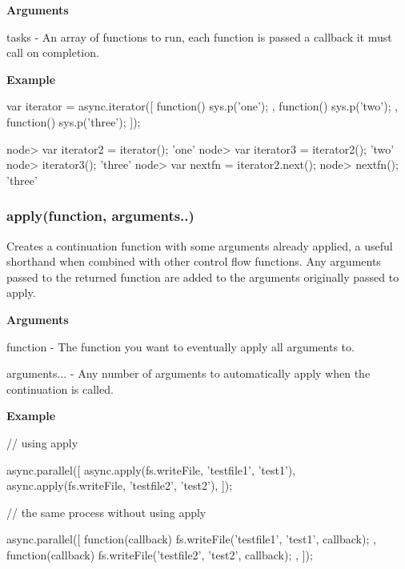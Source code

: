 {\bfseries Arguments}


\begin{DoxyItemize}
\item tasks -\/ An array of functions to run, each function is passed a callback it must call on completion.
\end{DoxyItemize}

{\bfseries Example} \begin{DoxyVerb}var iterator = async.iterator([
    function(){ sys.p('one'); },
    function(){ sys.p('two'); },
    function(){ sys.p('three'); }
]);

node> var iterator2 = iterator();
'one'
node> var iterator3 = iterator2();
'two'
node> iterator3();
'three'
node> var nextfn = iterator2.next();
node> nextfn();
'three'
\end{DoxyVerb}






\label{_apply}%
 \subsubsection*{apply(function, arguments..)}

Creates a continuation function with some arguments already applied, a useful shorthand when combined with other control flow functions. Any arguments passed to the returned function are added to the arguments originally passed to apply.

{\bfseries Arguments}


\begin{DoxyItemize}
\item function -\/ The function you want to eventually apply all arguments to.
\item arguments... -\/ Any number of arguments to automatically apply when the continuation is called.
\end{DoxyItemize}

{\bfseries Example} \begin{DoxyVerb}// using apply

async.parallel([
    async.apply(fs.writeFile, 'testfile1', 'test1'),
    async.apply(fs.writeFile, 'testfile2', 'test2'),
]);


// the same process without using apply

async.parallel([
    function(callback){
        fs.writeFile('testfile1', 'test1', callback);
    },
    function(callback){
        fs.writeFile('testfile2', 'test2', callback);
    },
]);
\end{DoxyVerb}


